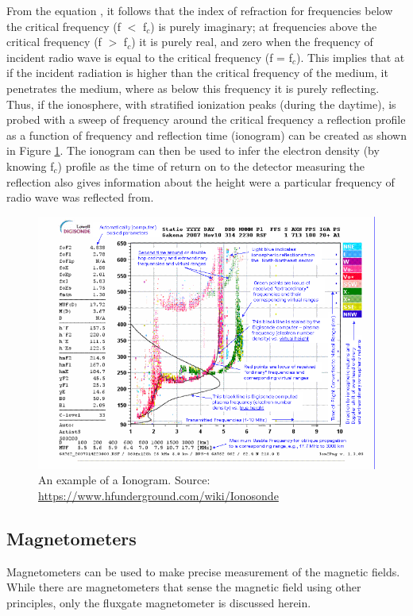 \documentclass[crop=false,class=mitthesis,oneside,font=12pt]{standalone}
\begin{document}
From the equation \theequation, it follows that  the index of refraction for frequencies below the critical frequency (f $<$ f$_c$) is purely imaginary; at frequencies above the critical frequency (f $>$ f$_c$) it is purely real, and zero when the frequency of incident radio wave is equal to the critical frequency (f = f$_c$). This implies that at if the incident radiation is higher than the critical frequency of the medium, it penetrates the medium, where as below this frequency it is purely reflecting. Thus, if the ionosphere, with stratified ionization peaks (during the daytime), is probed with a sweep of frequency around the critical frequency a reflection profile as a function of frequency and reflection time (ionogram) can be created as shown in Figure \ref{fig:digi_s}. The ionogram can then be used to infer the electron density (by knowing f$_c$) profile as the time of return on to the detector measuring the reflection also gives information about the height were a particular frequency of radio wave was reflected from.
\begin{figure}[H]
	\centering\includegraphics[width=30pc]{HAARP_ionogram.png}
	\caption{An example of a Ionogram. Source: \url{https://www.hfunderground.com/wiki/Ionosonde}}
	\label{fig:digi_s}
\end{figure}


\subsection{Magnetometers}
Magnetometers can be used to make precise measurement of the magnetic fields. While there are magnetometers that sense the magnetic field using other principles, only the fluxgate magnetometer is discussed herein. 
\end{document}
